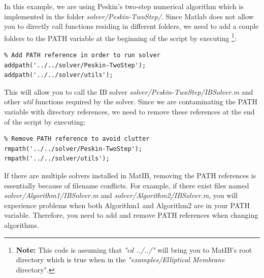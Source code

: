 \documentclass{article}
\newcommand{\softwarename}{MatIB}
\begin{document}
In this example, we are using Peskin's two-step numerical algorithm \cite{PeskinIB} which is implemented in the folder \emph{solver/Peskin-TwoStep/}. 
Since Matlab does not allow you to directly call functions residing in different folders, we need to add a couple folders to the PATH variable at the beginning of the script by executing
\footnote{{\bf Note:} This code is assuming that \emph{"cd ../../"} will bring you to \softwarename's root directory which is true when in the \emph{"examples/Elliptical Membrane} directory".}:
\begin{lstlisting}
% Add PATH reference in order to run solver
addpath('../../solver/Peskin-TwoStep');
addpath('../../solver/utils');
\end{lstlisting}
This will allow you to call the IB solver \emph{solver/Peskin-TwoStep/IBSolver.m} and other \emph{util} functions required by the solver. Since 
we are contaminating the PATH variable with directory references, we need to remove these references at the end of the script by executing:
\begin{lstlisting}
% Remove PATH reference to avoid clutter
rmpath('../../solver/Peskin-TwoStep');
rmpath('../../solver/utils');
\end{lstlisting}
If there are multiple solvers installed in \softwarename, removing the PATH references is essentially because of filename conflicts. For example, 
if there exist files named \emph{solver/Algorithm1/IBSolver.m} and \emph{solver/Algorithm2/IBSolver.m}, 
you will experience problems when both Algorithm1 and Algorithm2 are in your PATH variable. Therefore, you need to add and remove PATH references when 
changing algorithms.
\end{document}
